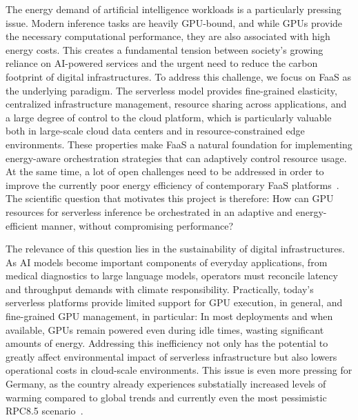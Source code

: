 The energy demand of artificial intelligence workloads is a particularly pressing issue.
Modern inference tasks are heavily GPU-bound, and while GPUs provide the necessary computational performance, they are also associated with high energy costs.
This creates a fundamental tension between society's growing reliance on AI-powered services and the urgent need to reduce the carbon footprint of digital infrastructures.
To address this challenge, we focus on FaaS as the underlying paradigm.
The serverless model provides fine-grained elasticity, centralized infrastructure management, resource sharing across applications, and a large degree of control to the cloud platform, which is particularly valuable both in large-scale cloud data centers and in resource-constrained edge environments.
These properties make FaaS a natural foundation for implementing energy-aware orchestration strategies that can adaptively control resource usage.
At the same time, a lot of open challenges need to be addressed in order to improve the currently poor energy efficiency of contemporary FaaS platforms~\cite{sharma_challenges_2023}.
The scientific question that motivates this project is therefore: How can GPU resources for serverless inference be orchestrated in an adaptive and energy-efficient manner, without compromising performance?

The relevance of this question lies in the sustainability of digital infrastructures.
As AI models become important components of everyday applications, from medical diagnostics to large language models, operators must reconcile latency and throughput demands with climate responsibility.
Practically, today's serverless platforms provide limited support for GPU execution, in general, and fine-grained GPU management, in particular: In most deployments and when available, GPUs remain powered even during idle times, wasting significant amounts of energy.
Addressing this inefficiency not only has the potential to greatly affect environmental impact of serverless infrastructure but also lowers operational costs in cloud-scale environments.
This issue is even more pressing for Germany, as the country already experiences substatially increased levels of warming compared to global trends and currently even the most pessimistic RPC8.5 scenario~\cite{dwd_2024_klimastatusbericht}.

